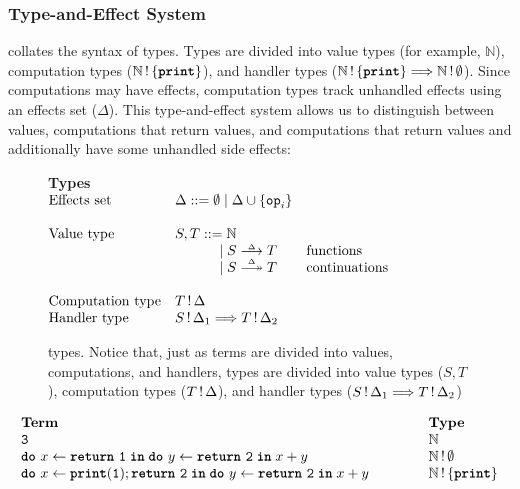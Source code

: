 \subsubsection{Type-and-Effect System}
 collates the syntax of \efflang{} types. Types are divided into value types (for example, $\mathbb{N}$), computation types ($\effectType[\{\textbf{\texttt{print}} \}]{\mathbb{N}}$), and handler types ($\handlerType{\effectType[\{\textbf{\texttt{print}} \}]{\mathbb{N}}}{\effectType[\emptyset]{\mathbb{N}}}$). Since computations may have effects, computation types track unhandled effects using an effects set ($\Delta$). This type-and-effect system allows us to distinguish between values, computations that return values, and computations that return values and additionally have some unhandled side effects:


\begin{figure}
  \begin{eff-desc}
  {\large \textbf{Types}}\\

  $\begin{array}{@{}lllr}
    \text{Effects set} & \Delta ::= \emptyset \mid \Delta \cup \{ \texttt{op}_i \} \\ \\
    \text{Value type} & S, T ::= \mathbb{N} & \\
                              &\quad\quad\quad\,\mid \functionType{S}{T} & \text{functions}\\
                              &\quad\quad\quad\,\mid \continuationType{S}{T} & \text{continuations}\\ \\
    \text{Computation type} & \effectType{T} \\
    \text{Handler type} & \handlerType{\effectType[\Delta_1]{S}}{\effectType[\Delta_2]{T}}
  \end{array}$
  \end{eff-desc}
  \caption{\efflang{} types. Notice that, just as terms are divided into values, computations, and handlers, types are divided into value types ($S, T$), computation types ($\effectType{T}$), and handler types ($\handlerType{\effectType[\Delta_1]{S}}{\effectType[\Delta_2]{T}}$)}
  \label{fig:efflang-type-syntax}
\end{figure}

\[
\begin{array}{lll}
  \textbf{Term} &\hspace{8mm}& \textbf{Type} \\
  \texttt{3} && \mathbb{N} \\ 
  \bind{x}{\return{\texttt{1}}}{\bind{y}{\return{\texttt{2}}}{x + y}} &&  \effectType[\emptyset]{\mathbb{N}} \\ 
  \bind{x}{\print{1}; \return{\texttt{2}}}{\bind{y}{\return{\texttt{2}}}{x + y}} &&  \effectType[\{ \texttt{\textbf{print}}\}]{\mathbb{N}} \\ 
\end{array}
\]

